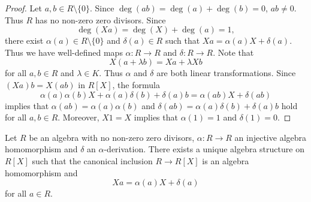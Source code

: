 \begin{proof}
    Let $a,b\in R\setminus\{0\}$. Since $\deg(ab)=\deg(a)+\deg(b)=0$, 
    $ab\ne 0$. Thus $R$ has no non-zero zero divisors. Since 
    \[
    \deg(Xa)=\deg(X)+\deg(a)=1,
    \]
    there exist $\alpha(a)\in R\setminus\{0\}$ and $\delta(a)\in R$ such that 
    $Xa=\alpha(a)X+\delta(a)$. Thus we have well-defined maps
    $\alpha\colon R\to R$ and $\delta\colon R\to R$. Note that 
    \[
    X(a+\lambda b)=Xa+\lambda Xb
    \]
    for all $a,b\in R$ and $\lambda\in K$. Thus $\alpha$ and $\delta$ are both 
    linear transformations. Since 
    $(Xa)b=X(ab)$ in $R[X]$, the formula 
    \[
    \alpha(a)\alpha(b)X+\alpha(a)\delta(b)+\delta(a)b=\alpha(ab)X+\delta(ab)
    \]
    implies that $\alpha(ab)=\alpha(a)\alpha(b)$ and $\delta(ab)=\alpha(a)\delta(b)+\delta(a)b$ 
    hold for all $a,b\in R$. Moreover, $X1=X$ implies that $\alpha(1)=1$ and $\delta(1)=0$. 
\end{proof}

\begin{theorem}
\label{thm:Ore}
    Let $R$ be an algebra with no non-zero zero divisors, 
    $\alpha\colon R\to R$ an injective algebra homomorphism and $\delta$ an $\alpha$-derivation. 
    There exists a unique algebra structure on $R[X]$ such that 
    the canonical inclusion $R\to R[X]$ is an algebra homomorphism and 
    \[
    Xa=\alpha(a)X+\delta(a)
    \]
    for all $a\in R$. 
\end{theorem}


